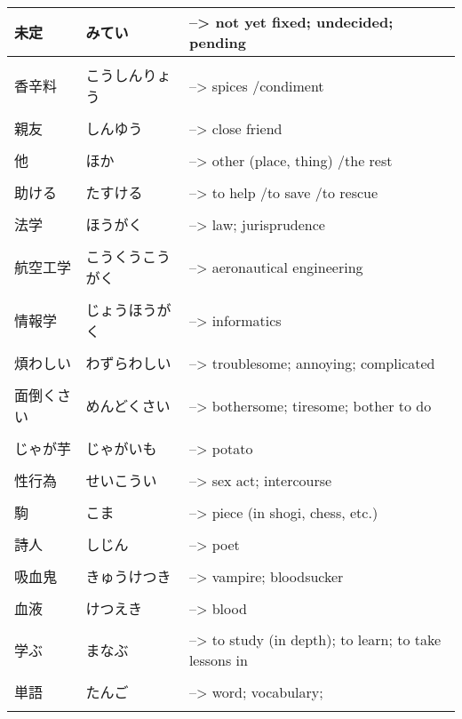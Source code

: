 \documentclass{article}
\begin{document}
\begin{tabular}{ l | l l }
未定				& みてい					&--> not yet fixed; undecided; pending		\\ \hline\\[-1em]
香辛料			& こうしんりょう 				&--> spices /condiment						\\ \hline\\[-1em]
親友				& しんゆう					&--> close friend							\\ \hline\\[-1em]
他				& ほか					&--> other (place, thing) /the rest			\\ \hline\\[-1em]
助ける			& たすける					&--> to help /to save /to rescue        \\ \hline\\[-1em]
法学    & ほうがく &--> law; jurisprudence  \\ \hline\\[-1em]
航空工学    & こうくうこうがく    &--> aeronautical engineering   \\ \hline\\[-1em]
情報学    &じょうほうがく   &--> informatics   \\ \hline\\[-1em]
煩わしい     &わずらわしい   &--> troublesome; annoying; complicated   \\ \hline\\[-1em]
面倒くさい     &めんどくさい   &--> bothersome; tiresome; bother to do   \\ \hline\\[-1em]
じゃが芋    &じゃがいも   &--> potato   \\ \hline\\[-1em]
性行為     &せいこうい   &--> sex act; intercourse   \\ \hline\\[-1em]
駒    &こま   &--> piece (in shogi, chess, etc.)   \\ \hline\\[-1em]
詩人    &しじん   &--> poet   \\ \hline\\[-1em]
吸血鬼    &きゅうけつき   &--> vampire; bloodsucker   \\ \hline\\[-1em]
血液    &けつえき    &--> blood   \\ \hline\\[-1em]
学ぶ     &まなぶ   &--> to study (in depth); to learn; to take lessons in   \\ \hline\\[-1em]
単語    &たんご   &--> word; vocabulary;   \\ \hline\\[-1em]

\end{tabular}
\end{document}
